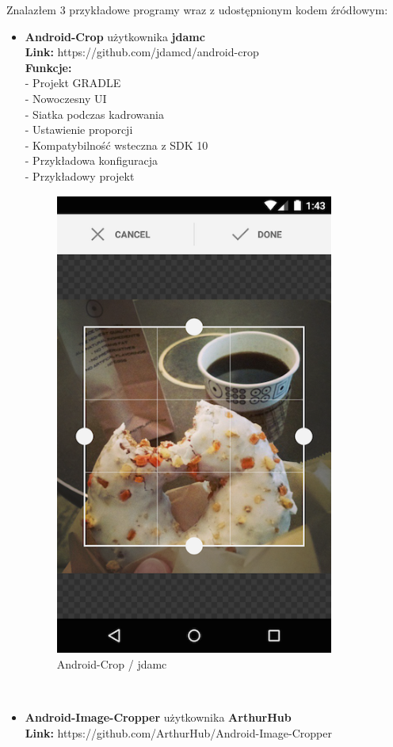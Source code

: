 Znalazłem 3 przykładowe programy wraz z udostępnionym kodem źródłowym:

\begin{itemize}
\item \textbf{Android-Crop} użytkownika \textbf{jdamc}\\
\textbf{Link:} https://github.com/jdamcd/android-crop\\

\noindent \textbf{Funkcje:}\\
- Projekt GRADLE\\
- Nowoczesny UI\\
- Siatka podczas kadrowania\\
- Ustawienie proporcji\\
- Kompatybilność wsteczna z SDK 10\\
- Przykładowa konfiguracja\\
- Przykładowy projekt\\
\begin{figure}[h!]
\centering
\includegraphics[width=0.25\linewidth]{fig/d1}
\caption{Android-Crop / jdamc}
\label{fig:d1}
\end{figure}\\

\item \textbf{Android-Image-Cropper} użytkownika \textbf{ArthurHub}\\
\textbf{Link:} https://github.com/ArthurHub/Android-Image-Cropper\\


\end{itemize}
